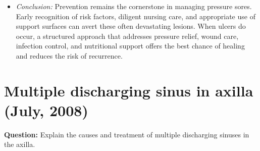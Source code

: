 \documentclass{article}
\begin{document}
\begin{itemize}
\item \emph{Conclusion:} Prevention remains the cornerstone in managing pressure sores. Early recognition of risk factors, diligent nursing care, and appropriate use of support surfaces can avert these often devastating lesions. When ulcers do occur, a structured approach that addresses pressure relief, wound care, infection control, and nutritional support offers the best chance of healing and reduces the risk of recurrence.


\end{itemize}

\section{Multiple discharging sinus in axilla (July, 2008)}

\textbf{Question:} Explain the causes and treatment of multiple discharging sinuses in the axilla.
\end{document}
